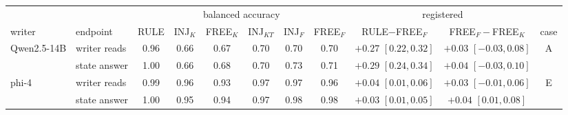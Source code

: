\begin{tabular}{l l cccccc cc c}
\toprule
 & & \multicolumn{6}{c}{balanced accuracy} & \multicolumn{2}{c}{registered} & \\
\cmidrule(lr){3-8}\cmidrule(lr){9-10}
writer & endpoint & RULE & INJ$_K$ & FREE$_K$ & INJ$_{KT}$ & INJ$_F$ & FREE$_F$ & RULE$-$FREE$_F$ & FREE$_F-$FREE$_K$ & case \\
\midrule
Qwen2.5-14B & writer reads & 0.96 & 0.66 & 0.67 & 0.70 & 0.70 & 0.70 & $+0.27$ $[0.22,0.32]$ & $+0.03$ $[-0.03,0.08]$ & A \\
 & state answer & 1.00 & 0.66 & 0.68 & 0.70 & 0.73 & 0.71 & $+0.29$ $[0.24,0.34]$ & $+0.04$ $[-0.03,0.10]$ &  \\
phi-4 & writer reads & 0.99 & 0.96 & 0.93 & 0.97 & 0.97 & 0.96 & $+0.04$ $[0.01,0.06]$ & $+0.03$ $[-0.01,0.06]$ & E \\
 & state answer & 1.00 & 0.95 & 0.94 & 0.97 & 0.98 & 0.98 & $+0.03$ $[0.01,0.05]$ & $+0.04$ $[0.01,0.08]$ &  \\
\bottomrule
\end{tabular}
